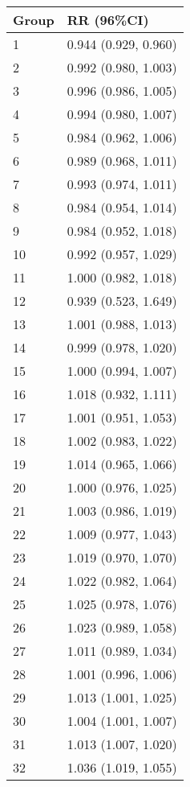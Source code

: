 \begin{tabular}{ll}
  \hline
Group & RR (96\%CI) \\ 
  \hline
   1 & 0.944 (0.929, 0.960) \\ 
     2 & 0.992 (0.980, 1.003) \\ 
     3 & 0.996 (0.986, 1.005) \\ 
     4 & 0.994 (0.980, 1.007) \\ 
     5 & 0.984 (0.962, 1.006) \\ 
     6 & 0.989 (0.968, 1.011) \\ 
     7 & 0.993 (0.974, 1.011) \\ 
     8 & 0.984 (0.954, 1.014) \\ 
     9 & 0.984 (0.952, 1.018) \\ 
    10 & 0.992 (0.957, 1.029) \\ 
    11 & 1.000 (0.982, 1.018) \\ 
    12 & 0.939 (0.523, 1.649) \\ 
    13 & 1.001 (0.988, 1.013) \\ 
    14 & 0.999 (0.978, 1.020) \\ 
    15 & 1.000 (0.994, 1.007) \\ 
    16 & 1.018 (0.932, 1.111) \\ 
    17 & 1.001 (0.951, 1.053) \\ 
    18 & 1.002 (0.983, 1.022) \\ 
    19 & 1.014 (0.965, 1.066) \\ 
    20 & 1.000 (0.976, 1.025) \\ 
    21 & 1.003 (0.986, 1.019) \\ 
    22 & 1.009 (0.977, 1.043) \\ 
    23 & 1.019 (0.970, 1.070) \\ 
    24 & 1.022 (0.982, 1.064) \\ 
    25 & 1.025 (0.978, 1.076) \\ 
    26 & 1.023 (0.989, 1.058) \\ 
    27 & 1.011 (0.989, 1.034) \\ 
    28 & 1.001 (0.996, 1.006) \\ 
    29 & 1.013 (1.001, 1.025) \\ 
    30 & 1.004 (1.001, 1.007) \\ 
    31 & 1.013 (1.007, 1.020) \\ 
    32 & 1.036 (1.019, 1.055) \\ 
   \hline
\end{tabular}


